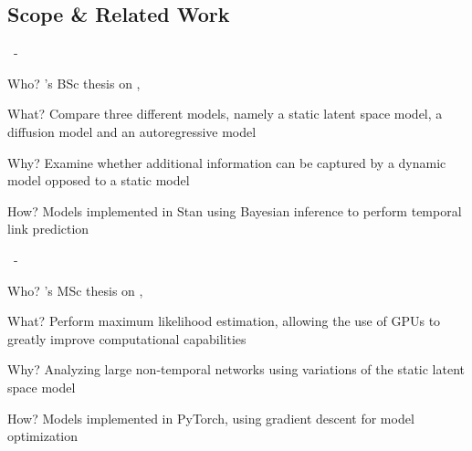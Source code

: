 \documentclass{beamer}
\newenvironment{xframe}
    {\begin{frame}{
        \ifx\insertsubsection\empty
            \strut
        \else\ifx\insertsubsubsection\empty
            \insertsection
        \else
            \insertsection~-~\insertsubsection
        \fi\fi
    }{
        \ifx\insertsubsection\empty
            \insertsection
        \else\ifx\insertsubsubsection\empty
            \insertsubsection
        \else
            \insertsubsubsection
        \fi\fi
    }}
    {\end{frame}}
\newenvironment{xblock}[1]
    {\begin{block}{#1}}
    {\end{block}}
\begin{document}
    \subsection{Scope \& Related Work}
    
    \begin{xframe}
        \begin{xblock}{Who?}
            \citeauthor{zangenberg2018a}'s BSc thesis \cite{zangenberg2018a} on , \citeyear{zangenberg2018a}
        \end{xblock}
        
        \begin{xblock}{What?}
            Compare three different models, namely a static latent space model, a diffusion model and an autoregressive model
        \end{xblock}
        
        \begin{xblock}{Why?}
            Examine whether additional information can be captured by a dynamic model opposed to a static model
        \end{xblock}
        
        \begin{xblock}{How?}
            Models implemented in Stan using Bayesian inference to perform temporal link prediction
        \end{xblock}
    \end{xframe}
        
    \begin{xframe}
        \begin{xblock}{Who?}
            \citeauthor{jacobsen2018a}'s MSc thesis \cite{jacobsen2018a} on , \citeyear{jacobsen2018a}
        \end{xblock}
        
        
        \begin{xblock}{What?}
            Perform maximum likelihood estimation, allowing the use of GPUs to greatly improve computational capabilities
        \end{xblock}
        
        \begin{xblock}{Why?}
            Analyzing large non-temporal networks using variations of the static latent space model
        \end{xblock}
        
        \begin{xblock}{How?}
            Models implemented in PyTorch, using gradient descent for model optimization
        \end{xblock}
    \end{xframe}
    
\end{document}
